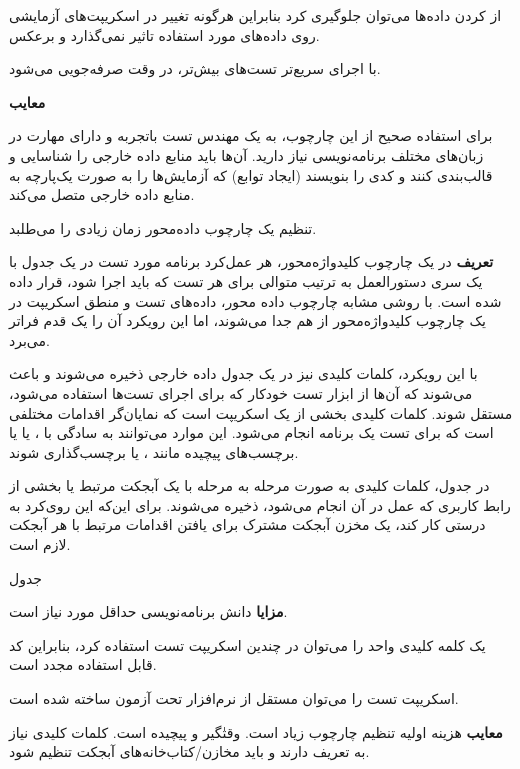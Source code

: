 	از  کردن داده‌ها می‌توان جلوگیری کرد بنابراین هرگونه تغییر در اسکریپت‌های آزمایشی روی داده‌های مورد استفاده تاثیر نمی‌گذارد و برعکس.
	
	با اجرای سریع‌تر تست‌های بیش‌تر، در وقت صرفه‌جویی می‌شود.
	
	
	\textbf{معایب}
	
	برای استفاده صحیح از این چارچوب، به یک مهندس تست باتجربه و دارای مهارت در زبان‌های مختلف برنامه‌نویسی نیاز دارید. آن‌ها باید منابع داده خارجی را شناسایی و قالب‌بندی کنند و کدی را بنویسند (ایجاد توابع) که آزمایش‌ها را به صورت یک‌پارچه به منابع داده خارجی متصل می‌کند.
	
	تنظیم یک چارچوب داده‌محور زمان زیادی را می‌طلبد.

	
	
	 
	\textbf{تعریف}
	در یک چارچوب کلید‌واژه‌محور‌، هر عمل‌کرد برنامه مورد تست در یک جدول با یک سری دستورالعمل به ترتیب متوالی برای هر تست که باید اجرا شود، قرار داده شده است. با روشی مشابه چارچوب داده محور، داده‌های تست و منطق اسکریپت در یک چارچوب کلیدواژه‌محور از هم جدا می‌شوند، اما این رویکرد آن را یک قدم فراتر می‌برد.
	
	با این رویکرد، کلمات کلیدی نیز در یک جدول داده خارجی ذخیره می‌شوند و باعث می‌شوند که آن‌ها از ابزار تست خودکار که برای اجرای تست‌ها استفاده می‌شود، مستقل شوند. کلمات کلیدی بخشی از یک اسکریپت است که نمایان‌گر اقدامات مختلفی است که برای تست  یک برنامه انجام می‌شود. این موارد می‌توانند به سادگی با ، یا  یا برچسب‌های پیچیده مانند ، یا  برچسب‌گذاری شوند.
	
	در جدول، کلمات کلیدی به صورت مرحله به مرحله با یک آبجکت مرتبط یا بخشی از رابط کاربری که عمل در آن انجام می‌شود، ذخیره می‌شوند. برای این‌که این روی‌کرد به درستی کار کند، یک مخزن آبجکت مشترک برای یافتن اقدامات مرتبط با هر آبجکت لازم است.
	
	جدول
	
	
	
	\textbf{مزایا}
	دانش برنامه‌نویسی حداقل مورد نیاز است.
	
	یک کلمه کلیدی واحد را می‌توان در چندین اسکریپت تست استفاده کرد‌، بنابراین کد قابل استفاده مجدد است.
	
	اسکریپت تست را می‌توان مستقل از نرم‌افزار تحت آزمون ساخته شده است.
	
	\textbf{معایب}
		هزینه اولیه تنظیم چارچوب زیاد است. وقتٰگیر و پیچیده است. کلمات کلیدی نیاز به تعریف دارند و باید مخازن/کتاب‌خانه‌های آبجکت تنظیم شود.
	
